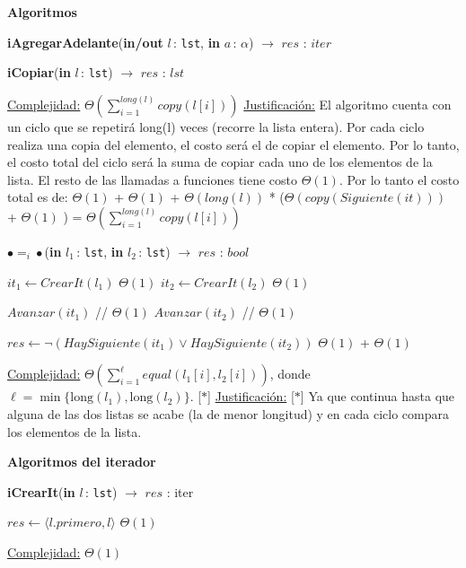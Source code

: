 \documentclass[a4paper,10pt]{article}
\let\TipoVariable=\texttt
\let\ModificadorArgumento=\textbf
\newcommand{\In}[2]{\ModificadorArgumento{in} \ensuremath{#1}\,: \TipoVariable{#2}\xspace}
\newcommand{\Inout}[2]{\ModificadorArgumento{in/out} \ensuremath{#1}\,: \TipoVariable{#2}\xspace}
\newenvironment{Algoritmos}{%
  \vspace*{2ex}%
  \noindent\textbf{\Large Algoritmos}%
  \vspace*{2ex}%
}{}
\newcommand{\Titulo}[1]{
  \vspace*{1ex}\par\noindent\textbf{\large #1}\par
}
\begin{document}
\begin{Algoritmos}
\begin{







ithm}[H]{\textbf{iAgregarAdelante}(\Inout{l}{lst}, \In{a}{$\alpha$}) $\to$ $res$ : $iter$}
\begin{algorithm}[H]{\textbf{iCopiar}(\In{l}{lst}) $\to$ $res$ : $lst$}
\begin{algorithmic}[1]
		\medskip
		\Statex \underline{Complejidad:} $\Theta\left(\sum_{i=1}^{long(l)}copy({l[i]})\right)$
		\Statex \underline{Justificación:} El algoritmo cuenta con un ciclo que se repetirá long(l) veces (recorre la lista entera). Por cada ciclo realiza una copia del elemento, el costo será el de copiar el elemento. Por lo tanto, el costo total del ciclo será la suma de copiar cada uno de los elementos de la lista. El resto de las llamadas a funciones tiene costo $\Theta(1)$. Por lo tanto el costo total es de: $\Theta(1)$  + $\Theta(1)$ + $\Theta(long(l))$ * ($\Theta(copy(Siguiente(it)))$ + $\Theta(1)$ ) = $\Theta\left(\sum_{i=1}^{long(l)}copy({l[i]})\right)$
    \end{algorithmic}
\end{algorithm}	

	
\begin{algorithm}[H]{\textbf{$\bullet =_i \bullet$}(\In{l_1}{lst}, \In{l_2}{lst}) $\to$ $res$ : $bool$}
	\begin{algorithmic}[1]
			\State $it_1 \gets CrearIt(l_1)$	\Comment $\Theta(1)$
			\State $it_2 \gets CrearIt(l_2)$ 	\Comment $\Theta(1)$
			
			  \Comment [$\ast$]
			 	\State $Avanzar(it_1)$ // $\Theta(1)$
				\State $Avanzar(it_2)$	// $\Theta(1)$
			\EndWhile
			
			\State $res \gets \neg(HaySiguiente(it_1) \lor HaySiguiente(it_2))$	\Comment $\Theta(1)$ + $\Theta(1)$
    	
		\medskip
		\Statex \underline{Complejidad:} $\displaystyle\Theta\left(\sum_{i=1}^{\ell}{equal(l_1[i],l_2[i])}\right)$, donde $\ell = \min\{\text{long}(l_1),\text{long}(l_2)\}$. [$\ast$]
		\Statex \underline{Justificación:} [$\ast$] Ya que continua hasta que alguna de las dos listas se acabe (la de menor longitud) y en cada ciclo compara los elementos de la lista.
    \end{algorithmic}
\end{algorithm}


\Titulo{Algoritmos del iterador}	
 
\begin{algorithm}[H]
	\begin{algorithmic}[1]
		\State \textbf{iCrearIt}(\In{l}{lst}) $\to$ $res$ : iter
		
			\State $res \gets \langle l.primero, l \rangle$ 	\Comment $\Theta(1)$
    	
		\medskip
		\Statex \underline{Complejidad:} $\Theta(1)$
    \end{algorithmic}
\end{algorithm}	


\end{







ithm}
\end{Algoritmos}
\end{document}
